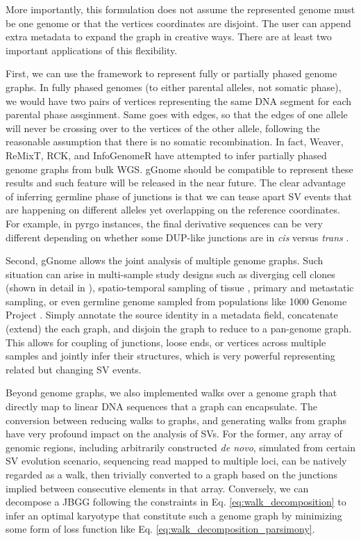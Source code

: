 \documentclass[phd,tocprelim]{cornell}
\begin{document}
More importantly, this formulation does not assume the represented genome must be one genome or that the vertices coordinates are disjoint. The user can append extra metadata to expand the graph in creative ways. There are at least two important applications of this flexibility.

First, we can use the framework to represent fully or partially phased genome graphs. In fully phased genomes (to either parental alleles, not somatic phase), we would have two pairs of vertices representing the same DNA segment for each parental phase assginment. Same goes with edges, so that the edges of one allele will never be crossing over to the vertices of the other allele, following the reasonable assumption that there is no somatic recombination. In fact, Weaver, ReMixT, RCK, and InfoGenomeR have attempted to infer partially phased genome graphs from bulk WGS. gGnome should be compatible to represent these results and such feature will be released in the near future. The clear advantage of inferring germline phase of junctions is that we can tease apart SV events that are happening on different alleles yet overlapping on the reference coordinates. For example, in pyrgo instances, the final derivative sequences can be very different depending on whether some DUP-like junctions are in \textit{cis} versus \textit{trans} \cite{Hadi2020-um}.

Second, gGnome allows the joint analysis of multiple genome graphs. Such situation can arise in multi-sample study designs such as diverging cell clones (shown in detail in ), spatio-temporal sampling of tissue \cite{Paulson2021-nd}, primary and metastatic sampling, or even germline genome sampled from populations like 1000 Genome Project \cite{Khurana2013-qc}. Simply annotate the source identity in a metadata field, concatenate (extend) the each graph, and disjoin the graph to reduce to a pan-genome graph. This allows for coupling of junctions, loose ends, or vertices across multiple samples and jointly infer their structures, which is very powerful representing related but changing SV events.

Beyond genome graphs, we also implemented walks over a genome graph that directly map to linear DNA sequences that a graph can encapsulate. The conversion between reducing walks to graphs, and generating walks from graphs have very profound impact on the analysis of SVs. For the former, any array of genomic regions, including arbitrarily constructed \textit{de novo}, simulated from certain SV evolution scenario, sequencing read mapped to multiple loci, can be natively regarded as a walk, then trivially converted to a graph based on the junctions implied between consecutive elements in that array. Conversely, we can decompose a JBGG following the constraints in Eq. \ref{eq:walk_decomposition} to infer an optimal karyotype that constitute such a genome graph by minimizing some form of loss function like Eq. \ref{eq:walk_decomposition_parsimony}.
\end{document}
